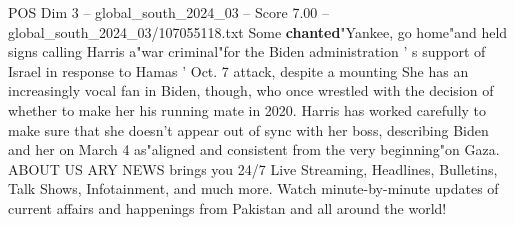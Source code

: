 \begin{textsample}{POS Dim 3 – global\_south\_2024\_03 – Score 7.00 – global\_south\_2024\_03/107055118.txt}
Some \textbf{chanted}"Yankee, go home"and held signs calling Harris a"war criminal"for the Biden administration ' s support of Israel in response to Hamas ' Oct. 7 attack, despite a mounting She has an increasingly vocal fan in Biden, though, who once wrestled with the decision of whether to make her his running mate in 2020.
Harris has worked carefully to make sure that she doesn't appear out of sync with her boss, describing Biden and her on March 4 as"aligned and consistent from the very beginning"on Gaza.
ABOUT US ARY NEWS brings you 24/7 Live Streaming, Headlines, Bulletins, Talk Shows, Infotainment, and much more.
Watch minute-by-minute updates of current affairs and happenings from Pakistan and all around the world!

\end{textsample}
